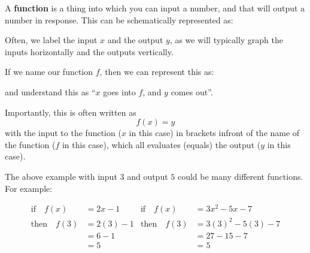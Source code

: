 \documentclass[12pt]{article}
\begin{document}
A \textbf{function} is a thing into which you can input a number, and that will output a number in response. This can be schematically represented as:

\begin{center}
\end{center}

Often, we label the input $x$ and the output $y$, as we will typically graph the inputs horizontally and the outputs vertically. 

If we name our function $f$, then we can represent this as:

\begin{center}
\end{center}
and understand this as ``$x$ goes into $f$, and $y$ comes out''.

Importantly, this is often written as 
\begin{equation*}
f(x) = y
\end{equation*}
with the input to the function ($x$ in this case) in brackets infront of the name of the function ($f$ in this case), which all evaluates (equals) the output ($y$ in this case). 

The above example with input $3$ and output $5$ could be many different functions. For example:

\begin{align*}
\text{if} \quad   f(x)  &= 2x - 1   & \text{if} \quad   f(x)  &= 3x^2 -5x - 7   \\
\text{then} \quad f(3)  &= 2(3) - 1 & \text{then} \quad f(3)  &= 3(3)^2 -5(3) - 7 \\
                        &= 6 - 1    &                         &= 27 - 15 - 7 \\
                        &= 5        &                         &= 5 \\
\end{align*}
\end{document}
